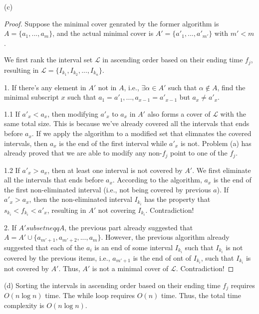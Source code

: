 \documentclass[10pt]{article}
\begin{document}
(c)
\begin{proof}
	Suppose the minimal cover genrated by the former algorithm is $A = \{a_1, ..., a_m\}$, and the actual minimal cover is $A' = \{a'_1, ..., a'_{m'}\}$ with $m'<m$.

	We first rank the interval set $\mathscr{L}$ in ascending order based on their ending time $f_j$, resulting in $\mathscr{L} = \{I_{k_1}, I_{k_2}, ..., I_{k_n}\}$.

	1. If there's any element in $A'$ not in $A$, i.e., $\exists \alpha \in A'$ such that $\alpha \notin A$, find the minimal subscript $x$ such that $a_1=a'_1, ..., a_{x-1}=a'_{x-1}$ but $a_x\neq a'_x$.

	1.1 If $a'_x < a_x$, then modifying $a'_x$ to $a_x$ in $A'$ also forms a cover of $\mathscr{L}$ with the same total size. This is because we've already covered all the intervals that ends before $a_x$. If we apply the algorithm to a modified set that elimnates the covered intervals, then $a_x$ is the end of the first interval while $a'_x$ is not. Problem (a) has already proved that we are able to modify any non-$f_j$ point to one of the $f_j$.
	
	1.2 If $a'_x > a_x$, then at least one interval is not covered by $A'$. We first eliminate all the intervals that ends before $a_x$. According to the algorithm, $a_x$ is the end of the first non-eliminated interval (i.e., not being covered by previous $a$). If $a'_x > a_x$, then the non-eliminated interval $I_{k_i}$ has the property that $s_{k_i} < f_{k_i} < a'_x$, resulting in $A'$ not covering $I_{k_i}$. Contradiction!

	2. If $A' subsetneqq A$, the previous part already suggested that $A = A'\cup \{a_{m'+1}, a_{m'+2}, ..., a_{m}\}$. However, the previous algorithm already suggested that each of the $a_i$ is an end of some interval $I_{k_i}$ such that $I_{k_i}$ is not covered by the previous items, i.e., $a_{m'+1}$ is the end of ont of $I_{k_i}$, such that $I_{k_i}$ is not covered by $A'$. Thus, $A'$ is not a minimal cover of $\mathscr{L}$. Contradiction!
\end{proof}

(d) Sorting the intervals in ascending order based on their ending time $f_j$ requires $O(n\log n)$ time. The while loop requires $O(n)$ time. Thus, the total time complexity is $O(n\log n)$.

\newpage
\end{document}
